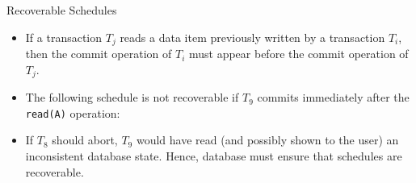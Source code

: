 \documentclass[aspectratio=169, xcolor=dvipsnames]{beamer}
\begin{document}
\begin{frame}{Recoverable Schedules}
    \begin{itemize}[<+->]
        \item If a transaction $T_j$ reads a data item previously written by a transaction $T_i$, then the commit operation of $T_i$ must appear before the commit operation of $T_j$.
        \item The following schedule is not recoverable if $T_9$ commits immediately after the \texttt{read(A)} operation:
    \end{itemize}
    \vspace{0.5em}
    \begin{itemize}[<+->]
        \item If $T_8$ should abort, $T_9$ would have read (and possibly shown to the user) an inconsistent database state. Hence, database must ensure that schedules are recoverable.
    \end{itemize}
\end{frame}
\end{document}
